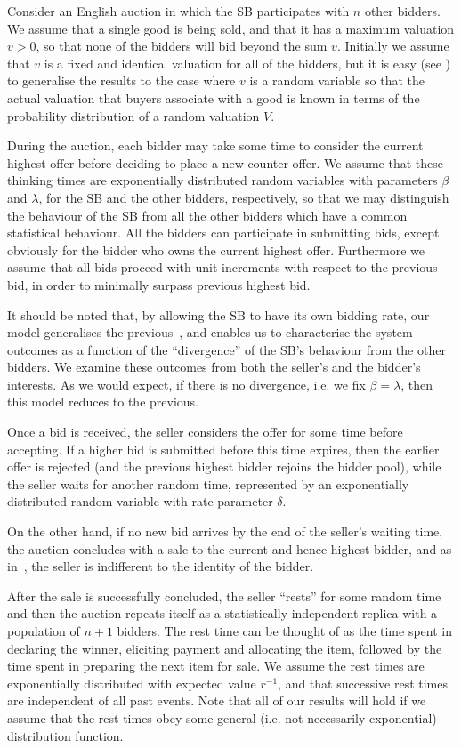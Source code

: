 \documentclass{article}
\begin{document}
Consider an English auction in which the SB participates with $n$
other bidders. We assume that a single good is being sold, and
that it has a maximum valuation $v>0$, so that none of the bidders
will bid beyond the sum $v$. Initially we assume that $v$ is a
fixed and identical valuation for all of the bidders, but it is
easy (see \cite{gelenbe06}) to generalise the results to the case
where $v$ is a  random variable so that the actual valuation that
buyers associate with a good is known in terms of the probability
distribution of a random valuation $V$.

During the auction, each bidder may take some time to consider the
current highest offer before deciding to place a new
counter-offer. We assume that these thinking times are
exponentially distributed random variables with parameters $\beta$
and $\lambda$, for the SB and the other bidders, respectively, so
that we may distinguish the behaviour of the SB from all the other
bidders which have a common statistical behaviour. All the bidders
can participate in submitting bids, except obviously for the
bidder who owns the current highest offer. Furthermore we assume
that all bids proceed with unit increments with respect to the
previous bid, in order to minimally surpass previous highest bid.

It should be noted that, by allowing the SB to have its own
bidding rate, our model generalises the previous~\cite{gelenbe06},
and enables us to characterise the system outcomes as a function
of the ``divergence'' of the SB's behaviour from the other
bidders. We examine these outcomes from both the seller's and the
bidder's interests. As we would expect, if there is no divergence,
i.e. we fix $\beta=\lambda$, then this model reduces to the
previous.

Once a bid is received, the seller considers the offer for some
time before accepting. If a higher bid is submitted before this
time expires, then the earlier offer is rejected (and the previous
highest bidder rejoins the bidder pool), while the seller waits
for another random time, represented by an exponentially
distributed random variable with rate parameter $\delta$.

On the other hand, if no new bid arrives by the end of the
seller's waiting time, the auction concludes with a sale to the
current and hence highest bidder, and as in~\cite{krishna02}, the
seller is indifferent to the identity of the bidder.

After the sale is successfully concluded, the seller ``rests'' for
some random time and then the auction repeats itself as a
statistically independent replica with a population of $n+1$
bidders. The rest time can be thought of as the time spent in
declaring the winner, eliciting payment and allocating the item,
followed by the time spent in preparing the next item for sale. We
assume the rest times are exponentially distributed with expected
value $r^{-1}$, and that successive rest times are independent of
all past events. Note that all of our results will hold if we
assume that the rest times obey some general (i.e. not necessarily
exponential) distribution function.
\end{document}

